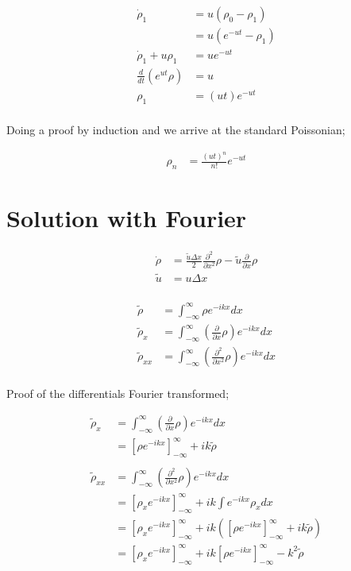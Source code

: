 \documentclass[a4paper]{article}
\begin{document}
\begin{align*}
\dot{\rho} _1 & = u ( \rho _0 - \rho _1 ) \\
& = u \left( e^{-ut} - \rho _1 \right) \\
\dot{\rho}_1 + u \rho _1 & = u e^{-ut} \\
\frac{d}{dt} \left( e ^{ut} \rho \right) & = u \\
\rho _1 & = (ut) e^{-ut} \\
\end{align*}

Doing a proof by induction and we arrive at the standard Poissonian; 

\begin{align*}
\rho _n & = \frac{(ut) ^n}{n!} e^{-ut}
\end{align*}

\section*{Solution with Fourier}

\begin{align*}
\dot{\rho} & = \frac{\tilde{u} \Delta x}{2} \frac{\partial ^2}{\partial x^2} \rho - \tilde{u} \frac{\partial}{\partial x}\rho \\
\tilde{u} & = u \Delta x \\
\end{align*}

\begin{align*}
\tilde{\rho} & = \int _{-\infty} ^{\infty} \rho e ^{-ikx} dx \\
\tilde{\rho} _x & = \int _{-\infty} ^{\infty} \left( \frac{\partial}{\partial x} \rho \right) e ^{-ikx} dx \\
\tilde{\rho} _{xx} & = \int _{-\infty} ^{\infty} \left( \frac{\partial ^2}{\partial x ^2} \rho \right) e ^{-ikx} dx \\
\end{align*}

Proof of the differentials Fourier transformed; 

\begin{align*}
\tilde{\rho} _x & = \int _{-\infty} ^{\infty} \left( \frac{\partial}{\partial x} \rho \right) e ^{-ikx} dx \\
& = \left[ \rho e ^{-ikx} \right] _{- \infty } ^{\infty} + ik \tilde{\rho} \\
\\
\tilde{\rho} _{xx} & = \int _{-\infty} ^{\infty} \left( \frac{\partial ^2}{\partial x ^2} \rho \right) e ^{-ikx} dx \\
& = \left[ \rho _x e^{-ikx} \right] _{-\infty} ^{\infty} + ik \int e ^{-ikx} \rho _x dx \\
& = \left[ \rho _x e^{-ikx} \right] _{-\infty} ^{\infty} + ik \left( 
\left[ \rho e ^{-ikx} \right] _{- \infty } ^{\infty} + ik \tilde{\rho} \right) \\
& = \left[ \rho _x e^{-ikx} \right] _{-\infty} ^{\infty} + ik \left[ \rho e ^{-ikx} \right] _{- \infty } ^{\infty} - k^2 \tilde{\rho}
\end{align*}
\end{document}
